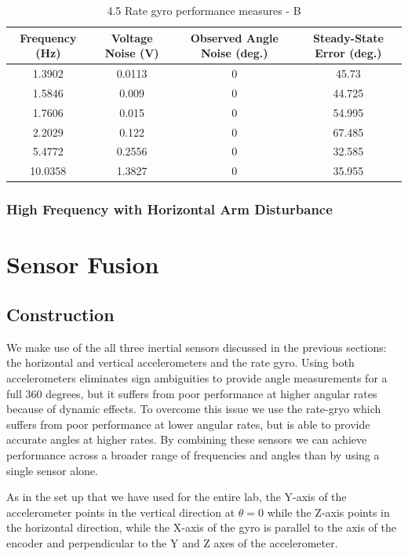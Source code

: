 \documentclass{article}
\theoremstyle{plain}
\theoremstyle{definition}
\theoremstyle{remark}
\begin{document}
\begin{table}
\begin{center}
    \begin{tabular}{|c|c|c|c|}
        \hline
        Frequency (Hz)  & Voltage Noise (V) & Observed Angle Noise (deg.) & Steady-State Error (deg.) \\ \hline
	1.3902  & 0.0113  & 0 & 45.73\\
       1.5846  & 0.009  & 0 & 44.725 \\
	1.7606  & 0.015 & 0 & 54.995  \\
	2.2029 & 0.122  & 0 & 67.485   \\
	5.4772 & 0.2556  & 0 & 32.585  \\
	10.0358 & 1.3827 & 0 & 35.955 \\
        \hline
    \end{tabular}
\caption{4.5 Rate gyro performance measures - B}  
\label{gyro45_tableB}
\end{center}
\end{table}

\subsubsection{High Frequency with Horizontal Arm Disturbance}

\clearpage
\section{Sensor Fusion}

\subsection{Construction}
We make use of the all three inertial sensors discussed in the previous sections: the horizontal and vertical accelerometers and the rate gyro.  Using both accelerometers eliminates sign ambiguities to provide angle measurements for a full 360 degrees, but it suffers from poor performance at higher angular rates because of dynamic effects.  To overcome this issue we use the rate-gryo which suffers from poor performance at lower angular rates, but is able to provide accurate angles at higher rates.  By combining these sensors we can achieve performance across a broader range of frequencies and angles than by using a single sensor alone.  

As in the set up that we have used for the entire lab, the Y-axis of the accelerometer points in the vertical direction at $\theta = 0$ while the Z-axis points in the horizontal direction, while the X-axis of the gyro is parallel to the axis of the encoder and perpendicular to the Y and Z axes of the accelerometer.  
\end{document}
